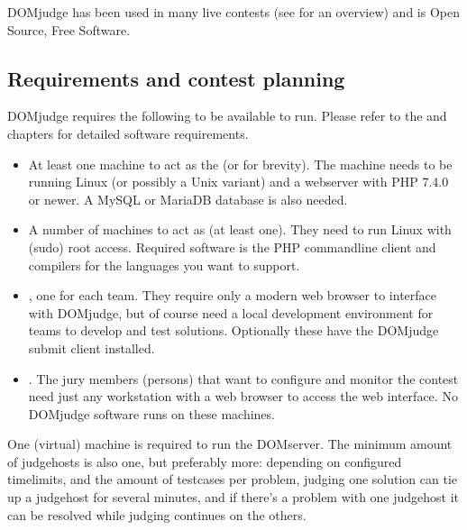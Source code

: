 \documentclass[a4paper,10pt,english,openany]{sphinxmanual}
\begin{document}
\sphinxAtStartPar
DOMjudge has been used in many live contests
(see  for an overview) and
is Open Source, Free Software.


\subsection{Requirements and contest planning}
\label{\detokenize{overview:requirements-and-contest-planning}}
\sphinxAtStartPar
DOMjudge requires the following to be available to run. Please refer to the
{\hyperref[\detokenize{install-domserver::doc}]{}} and {\hyperref[\detokenize{install-judgehost::doc}]{}}
chapters for detailed software requirements.
\begin{itemize}
\item {} 
\sphinxAtStartPar
At least one machine to act as the  (or  for
brevity). The machine needs to be running Linux (or possibly a Unix
variant) and a webserver with PHP 7.4.0 or newer. A MySQL or MariaDB
database is also needed.

\item {} 
\sphinxAtStartPar
A number of machines to act as  (at least one). They need to run
Linux with (sudo) root access. Required software is the PHP commandline
client and compilers for the languages you want to support.

\item {} 
\sphinxAtStartPar
{}, one for each team. They require only a modern
web browser to interface with DOMjudge, but of course need a local
development environment for teams to develop and test solutions. Optionally
these have the DOMjudge submit client installed.

\item {} 
\sphinxAtStartPar
{}. The jury members (persons) that want to
configure and monitor the contest need just any workstation with a web
browser to access the web interface. No DOMjudge software runs on these
machines.

\end{itemize}

\sphinxAtStartPar
One (virtual) machine is required to run the DOMserver. The minimum amount of
judgehosts is also one, but preferably more: depending on configured timelimits,
and the amount of testcases per problem, judging one solution can tie up a
judgehost for several minutes, and if there’s a problem with one judgehost it
can be resolved while judging continues on the others.
\end{document}
